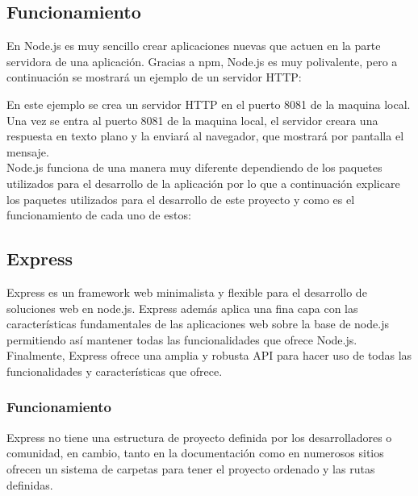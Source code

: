 \subsection{Funcionamiento}
En Node.js es muy sencillo crear aplicaciones nuevas que actuen en la parte servidora de una aplicación. Gracias a npm, Node.js es muy polivalente, pero a continuación se mostrará un ejemplo de un servidor HTTP:


En este ejemplo se crea un servidor HTTP en el puerto 8081 de la maquina local. Una vez se entra al puerto 8081 de la maquina local, el servidor creara una respuesta en texto plano y la enviará al navegador, que mostrará por pantalla el mensaje.\\

Node.js funciona de una manera muy diferente dependiendo de los paquetes utilizados para el desarrollo de la aplicación por lo que a continuación explicare los paquetes utilizados para el desarrollo de este proyecto y como es el funcionamiento de cada uno de estos:


\subsection{Express}
Express\cite{express} es un framework web minimalista y flexible para el desarrollo de soluciones web en node.js. Express además aplica una fina capa con las características fundamentales de las aplicaciones web sobre la base de node.js permitiendo así mantener todas las funcionalidades que ofrece Node.js. Finalmente, Express ofrece una amplia y robusta API para hacer uso de todas las funcionalidades y características que ofrece.

\subsubsection{Funcionamiento}
Express no tiene una estructura de proyecto definida por los desarrolladores o comunidad, en cambio, tanto en la documentación como en numerosos sitios ofrecen un sistema de carpetas para tener el proyecto ordenado y las rutas definidas.\\


